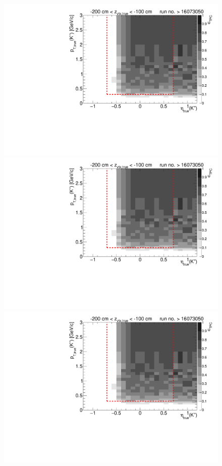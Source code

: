 \begin{figure}[hb]\ContinuedFloat
	\centering
	\parbox{0.495\textwidth}{
		\centering
		\includegraphics[width=\linewidth,page=11]{graphics/eff/Eff2D_TPC_kaon_Plus_RunRange2.pdf}\\
		\includegraphics[width=\linewidth,page=13]{graphics/eff/Eff2D_TPC_kaon_Plus_RunRange2.pdf}\\
		\includegraphics[width=\linewidth,page=15]{graphics/eff/Eff2D_TPC_kaon_Plus_RunRange2.pdf}\\
}
\end{figure}
